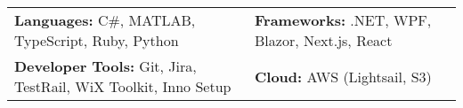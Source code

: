 
\begin{tabular}{p{10.5cm}p{8cm}}
    {\textbf{Languages:} C\#, MATLAB, TypeScript, Ruby, Python} & {\textbf{Frameworks:} .NET, WPF, Blazor, Next.js, React} \\
    {\textbf{Developer Tools:} Git, Jira, TestRail, WiX Toolkit, Inno Setup} & \textbf{Cloud:} AWS (Lightsail, S3) \\
\end{tabular}